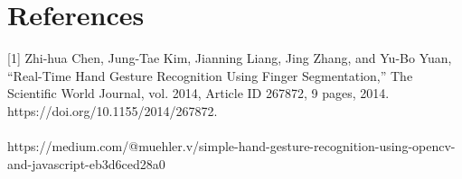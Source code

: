 \documentclass[twocolumn]{article}
\begin{document}
\section{References}
        [1]  Zhi-hua Chen, Jung-Tae Kim, Jianning Liang, Jing Zhang, and Yu-Bo Yuan, “Real-Time Hand Gesture Recognition Using Finger Segmentation,” The Scientific World Journal, vol. 2014, Article ID 267872, 9 pages, 2014. https://doi.org/10.1155/2014/267872.\\\\
        [2]  https://medium.com/@muehler.v/simple-hand-gesture-recognition-using-opencv-and-javascript-eb3d6ced28a0\\\\
        
\end{document}
